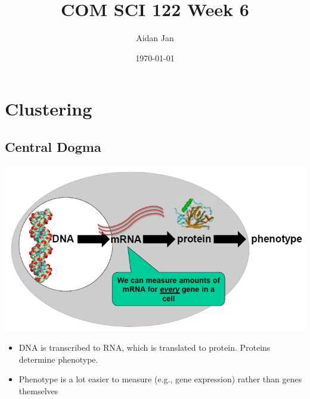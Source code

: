 \documentclass[10pt]{article}
\title{COM SCI 122 Week 6}
\author{Aidan Jan}
\date{\today}
\begin{document}
\maketitle

\section*{Clustering}

\subsection*{Central Dogma}
\begin{center}
    \includegraphics[scale=0.8]{W6_1.png}
\end{center}
\begin{itemize}
    \item DNA is transcribed to RNA, which is translated to protein.  Proteins determine phenotype.
    \item Phenotype is a lot easier to measure (e.g., gene expression) rather than genes themselves
\end{itemize}
\end{document}
